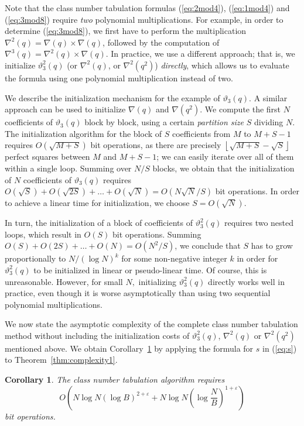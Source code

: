 \documentclass{mcom-l}
\newtheorem{cor}[thm]{Corollary}
\theoremstyle{definition}
\begin{document}
Note that the class number tabulation formulas (\ref{eq:2mod4}),
(\ref{eq:1mod4}) and (\ref{eq:3mod8}) require \emph{two} polynomial
multiplications. For example, in order to determine (\ref{eq:3mod8}),
we first have to perform the multiplication $\nabla^2(q) = \nabla(q)
\times \nabla(q)$, followed by the computation of $\nabla^3(q) =
\nabla^2(q) \times \nabla(q)$. In practice, we use a different
approach; that is, we initialize $\vartheta_3^2(q)$ (or $\nabla^2(q)$,
or $\nabla^2(q^2)$) \emph{directly}, which allows us to evaluate the
formula using one polynomial multiplication instead of two.

We describe the initialization mechanism for the example of
$\vartheta_3(q)$. A similar approach can be used to initialize
$\nabla(q)$ and $\nabla(q^2)$. We compute the first $N$ coefficients
of $\vartheta_3(q)$ block by block, using a certain \emph{partition
  size} $S$ dividing $N$. The initialization algorithm for the block of
$S$ coefficients from $M$ to $M + S - 1$ requires $O(\sqrt{M+S})$ bit
operations, as there are precisely $\left\lfloor \sqrt{M+S} -
\sqrt{S}\right\rfloor$ perfect squares between $M$ and $M+S-1$; we can
easily iterate over all of them within a single loop. Summing over
$N/S$ blocks, we obtain that the initialization of $N$ coefficients of
$\vartheta_3(q)$ requires $O(\sqrt S) + O(\sqrt{2S}) + \ldots +
O(\sqrt N) = O(N\sqrt N / S)$ bit operations. In order to achieve a
linear time for initialization, we choose $S = O(\sqrt N)$.

In turn, the initialization of a block of coefficients of
$\vartheta_3^2(q)$ requires two nested loops, which result in $O(S)$
bit operations. Summing $O(S) + O(2S) + \ldots + O(N) = O(N^2 / S)$,
we conclude that $S$ has to grow proportionally to $N/(\log N)^k$ for
some non-negative integer $k$ in order for $\vartheta_3^2(q)$ to be
initialized in linear or pseudo-linear time. Of course, this is
unreasonable. However, for small $N,$ initializing $\vartheta_3^2(q)$
directly works well in practice, even though it is worse
asymptotically than using two sequential polynomial
multiplications. 

We now state the asymptotic complexity of the complete class
number tabulation method without including the initialization costs of
$\vartheta_3^2(q)$, $\nabla^2(q)$ or $\nabla^2(q^2)$ mentioned
above. We obtain Corollary~\ref{cor:complexity2} by applying the
formula for $s$ in (\ref{eq:s}) to Theorem~\ref{thm:complexity1}.
\begin{cor} \label{cor:complexity2}
The class number tabulation algorithm requires
\begin{equation} \label{eq:o2}
O\left(N\log N (\log B)^{2+\varepsilon} + N\log N\left(\log\frac{N}{B}\right)^{1 + \varepsilon}\right)
\end{equation}
bit operations.
\end{cor}
\end{document}
